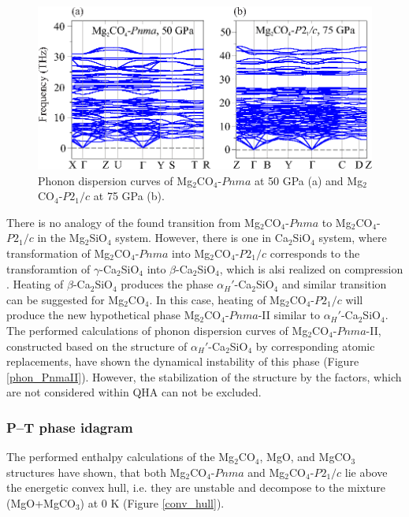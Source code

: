 \documentclass[a4paperm]{article}
\begin{document}
\begin{figure}[H]
	\includegraphics[width=\textwidth]{phon_mg} \centering
	\caption{Phonon dispersion curves of Mg$_2$CO$_4$-$Pnma$ at 50 GPa (a) and Mg$_2$CO$_4$-$P2_1/c$ at 75 GPa (b).
	} 	\label{phon_mg2co4_main}
\end{figure}



There is no analogy of the found transition from Mg$_2$CO$_4$-$Pnma$ to Mg$_2$CO$_4$-$P2_1/c$ in the Mg$_2$SiO$_4$ system.
However, there is one in Ca$_2$SiO$_4$ system, where transformation of Mg$_2$CO$_4$-$Pnma$ into Mg$_2$CO$_4$-$P2_1/c$ corresponds to the transforamtion of $\gamma$-Ca$_2$SiO$_4$ into $\beta$-Ca$_2$SiO$_4$, which is alsi realized on compression \cite{belmonte2017}.
Heating of $\beta$-Ca$_2$SiO$_4$ produces the phase $\alpha_H'$-Ca$_2$SiO$_4$ and similar transition can be suggested for Mg$_2$CO$_4$.
In this case, heating of Mg$_2$CO$_4$-$P2_1/c$ will produce the new hypothetical phase Mg$_2$CO$_4$-$Pnma$-II similar to $\alpha_H'$-Ca$_2$SiO$_4$.
The performed calculations of phonon dispersion curves of Mg$_2$CO$_4$-$Pnma$-II, constructed based on the structure of $\alpha_H'$-Ca$_2$SiO$_4$ by corresponding atomic replacements, have shown the dynamical instability of this phase (Figure \ref{phon_PnmaII}).
However, the stabilization of the structure by the factors, which are not considered within QHA can not be excluded.




\subsubsection*{P--T phase idagram}

The performed enthalpy calculations of the Mg$_2$CO$_4$, MgO, and MgCO$_3$ structures have shown, that both Mg$_2$CO$_4$-$Pnma$ and Mg$_2$CO$_4$-$P2_1/c$ lie above the energetic convex hull, i.e. they are unstable and decompose to the mixture (MgO+MgCO$_3$) at 0 K (Figure \ref{conv_hull}). 
\end{document}
